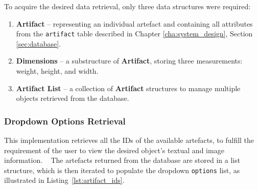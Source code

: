 To acquire the desired data retrieval, only three data structures were required:  
\begin{enumerate}
    \item \textbf{Artifact} – representing an individual artefact and containing all attributes from the \texttt{artifact} table described in Chapter \ref{cha:system_design}, Section \ref{sec:database}.  
    \item \textbf{Dimensions} – a substructure of \textbf{Artifact}, storing three measurements: weight, height, and width.  
    \item \textbf{Artifact List} – a collection of \textbf{Artifact} structures to manage multiple objects retrieved from the database.  
\end{enumerate}



\subsubsection{Dropdown Options Retrieval}
\label{sec:options}

This implementation retrieves all the \glspl{ID} of the available artefacts, to fulfill the requirement of the user to view the desired object's textual and image information.  
The artefacts returned from the database are stored in a list structure, which is then iterated to populate the dropdown \texttt{options} list, as illustrated in Listing~\ref{lst:artifact_ids}.


